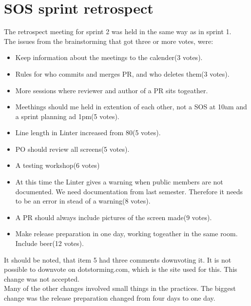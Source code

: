 \section{SOS sprint retrospect}

The retrospect meeting for sprint 2 was held in the same way as in sprint 1.\\
The issues from the brainstorming that got three or more votes, were:
\begin{itemize}
    \item Keep information about the meetings to the calender(3 votes).
    \item Rules for who commits and merges \gls{PR}, and who deletes them(3 votes).
    \item More sessions where reviewer and author of a \gls{PR} sits togeather. 
    \item Meethings should me held in extention of each other, not a SOS at 10am and a sprint planning ad 1pm(5 votes).  
    \item Line length in Linter increased from 80(5 votes).    \item PO should review all screens(5 votes).
    \item A testing workshop(6 votes)
    \item At this time the Linter gives a warning when public members are not documented. We need documentation from last semester. Therefore it needs to be an error in stead of a warning(8 votes).
    \item A \gls{PR} should always include pictures of the screen made(9 votes).
    \item Make release preparation in one day, working togeather in the same room. Include beer(12 votes).
\end{itemize}

It should be noted, that item 5 had three comments downvoting it. It is not possible to downvote on dotstorming.com, which is the site used for this. This change was not accepted.\\
Many of the other changes involved small things in the practices. The biggest change was the release preparation changed from four days to one day.\\
